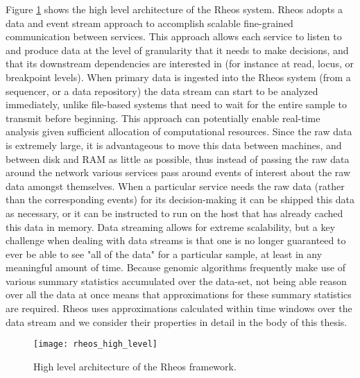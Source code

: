 Figure \ref{fig:rheos_architecture} shows the high level architecture of the Rheos system. Rheos adopts a data and event stream approach to accomplish scalable fine-grained communication between services\autocite{muthukrishnan2005data}. This approach allows each service to listen to and produce data at the level of granularity that it needs to make decisions, and that its downstream dependencies are interested in (for instance at read, locus, or breakpoint levels). When primary data is ingested into the Rheos system (from a sequencer, or a data repository) the data stream can start to be analyzed immediately\autocite{han2011data}, unlike file-based systems that need to wait for the entire sample to transmit before beginning. This approach can potentially enable real-time analysis given sufficient allocation of computational resources\autocite{aggarwal2007data}. Since the raw data is extremely large, it is advantageous to move this data between machines, and between disk and RAM as little as possible, thus instead of passing the raw data around the network various services pass around events of interest about the raw data amongst themselves\autocite{etzion2011event}. When a particular service needs the raw data (rather than the corresponding events) for its decision-making it can be shipped this data as necessary, or it can be instructed to run on the host that has already cached this data in memory. Data streaming allows for extreme scalability, but a key challenge when dealing with data streams is that one is no longer guaranteed to ever be able to see "all of the data" for a particular sample, at least in any meaningful amount of time\autocite{gaber2005mining}. Because genomic algorithms frequently make use of various summary statistics accumulated over the data-set\autocite{patel2012ngs,li2013aligning}, not being able reason over all the data at once means that approximations for these summary statistics are required. Rheos uses approximations calculated within time windows over the data stream\autocite{datar2002maintaining,babcock2002models} and we consider their properties in detail in the body of this thesis.

\begin{figure}[H]
\texttt{[image: rheos\_high\_level]}
\centering
\caption {High level architecture of the Rheos framework.}
\label{fig:rheos_architecture}
\end{figure}

